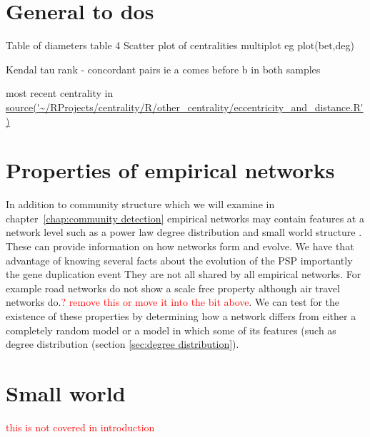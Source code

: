 \section{General to dos}

Table of diameters \cite{crescenzi2013computing}
 table 4 
Scatter plot of centralities multiplot eg plot(bet,deg)

Kendal tau rank - concordant pairs ie a comes before b in both samples 

most recent centrality in \url{source('~/RProjects/centrality/R/other_centrality/eccentricity_and_distance.R')}



\section{Properties of empirical networks}
\label{sec:Properties of empirical networks}
In addition to community structure which we will examine in chapter~\ref{chap:community detection} empirical networks may contain features at a network level such as a power law degree distribution \cite{barabasi1999emergence} \cite{barabasi1999mean} and small world structure \cite{watts1998collective}. These can provide information on how networks form and evolve. We have that advantage of knowing several facts about the evolution of the PSP importantly the gene duplication event \cite{grant2016molecular} They are not all shared by all empirical networks. For example road networks do not show a scale free property although air travel networks do.\textcolor{red}{? remove this or move it into the bit above}. We can test for the existence of these properties by determining how a network differs from either a completely random model or a model in which some of its features (such as degree distribution (section \ref{sec:degree distribution}).

\section{Small world}
\textcolor{red}{this is not covered in introduction}

